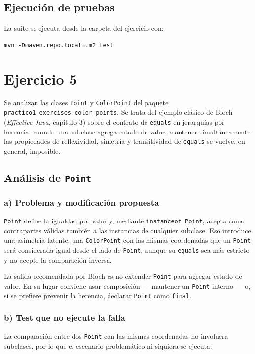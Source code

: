\documentclass[12pt,a4paper]{article}
\begin{document}
\subsection{Ejecución de pruebas}
La suite se ejecuta desde la carpeta del ejercicio con:
\begin{center}
\texttt{mvn -Dmaven.repo.local=.m2 test}
\end{center}

\section{Ejercicio 5}
Se analizan las clases \texttt{Point} y \texttt{ColorPoint} del paquete \texttt{practico1\_exercises.color\_points}. Se trata del ejemplo clásico de Bloch (\textit{Effective Java}, capítulo 3) sobre el contrato de \texttt{equals} en jerarquías por herencia: cuando una subclase agrega estado de valor, mantener simultáneamente las propiedades de reflexividad, simetría y transitividad de \texttt{equals} se vuelve, en general, imposible.

\subsection{Análisis de \texttt{Point}}
\subsubsection*{a) Problema y modificación propuesta}
\texttt{Point} define la igualdad por valor y, mediante \texttt{instanceof Point}, acepta como contrapartes válidas también a las instancias de cualquier subclase. Eso introduce una asimetría latente: una \texttt{ColorPoint} con las mismas coordenadas que un \texttt{Point} será considerada igual desde el lado de \texttt{Point}, aunque su \texttt{equals} sea más estricto y no acepte la comparación inversa.

La salida recomendada por Bloch es no extender \texttt{Point} para agregar estado de valor. En su lugar conviene usar composición --- mantener un \texttt{Point} interno --- o, si se prefiere prevenir la herencia, declarar \texttt{Point} como \texttt{final}.

\subsubsection*{b) Test que no ejecute la falla}
La comparación entre dos \texttt{Point} con las mismas coordenadas no involucra subclases, por lo que el escenario problemático ni siquiera se ejecuta.
\end{document}
